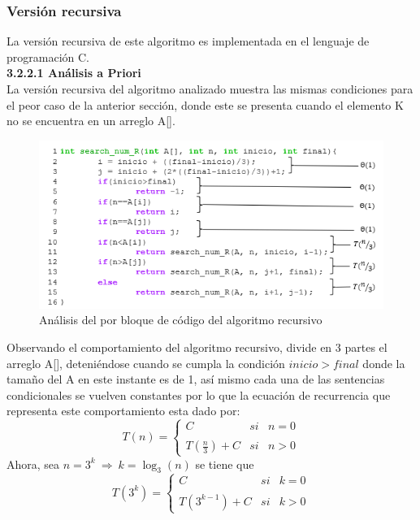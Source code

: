 \documentclass[12pt,twoside]{article}
\begin{document}
            \subsubsection{\large Versi\'on recursiva}
            La versi\'on recursiva de este algoritmo es implementada en el lenguaje de programaci\'on C.\\[0.5cm]  
                {\bf 3.2.2.1 An\'alisis a Priori}\\[0.2cm]
                La versi\'on recursiva del algoritmo analizado muestra las mismas condiciones para el peor caso de la anterior secci\'on, donde este se presenta cuando el elemento K no se encuentra en un arreglo A[].
                \begin{figure}[H]
                    \centering
                    \includegraphics[width=14cm]{imagenes/figura3_2_3.png}
                    \caption{An\'alisis del por bloque de c\'odigo del algoritmo recursivo}
                \end{figure}
                Observando el comportamiento del algoritmo recursivo, divide en 3 partes el arreglo A[], deteni\'endose cuando se cumpla la condici\'on  $inicio>final$ donde la tama\~no del A en este instante es de 1, as\'i mismo cada una de las sentencias condicionales se vuelven constantes por lo que la ecuaci\'on de recurrencia que representa este comportamiento esta dado por:
                $$T(n)= \left\{ \begin{array}{lcc}
                                C &   si  & n=0 \\
                                \\ T(\frac{n}{3})+C &  si & n>0
                                \end{array}
                        \right.$$
                Ahora, sea $n=3^{k}~\Rightarrow~k=\log_3{(n)}$ se tiene que $$T(3^{k})= \left\{ \begin{array}{lcc}
                                C &   si  & k=0\\
                                \\ T(3^{k-1})+C &  si & k>0
                                \end{array}
                        \right.$$\\
\end{document}
